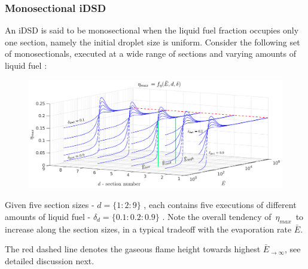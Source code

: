 \documentclass[12pt]{article}
\numberwithin{equation}{section}
\begin{document}
\begin{flushleft}
\subsubsection*{Monosectional iDSD}
An iDSD is said to be monosectional when the liquid fuel fraction occupies only one section, namely the initial droplet size is uniform. Consider the following set of monosectionals, executed at a wide range of sections and varying amounts of liquid fuel :
\begin{figure}[H]
\centering
\includegraphics[width=1.175\linewidth, center]{p_dist_mono_0.png}
\end{figure}
Given five section sizes - $d = \{ 1:2:9 \}$ , each contains five executions of different amounts of liquid fuel - $\delta_d = \{ 0.1:0.2:0.9 \}$ . Note the overall tendency of \,$\eta_{max}$\, to increase along the section sizes, in a typical tradeoff with the evaporation rate $\bar{E}$. 

The red dashed line denotes the gaseous flame height towards highest $\bar{E}_{\rightarrow \infty}$, see detailed discussion next.


\end{flushleft}
\end{document}
